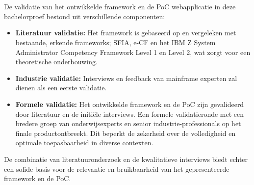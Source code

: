 \section{}%
\label{sec:validatie-poc}
De validatie van het ontwikkelde framework en de PoC webapplicatie in deze bachelorproef bestond uit verschillende componenten:
\begin{itemize}
	\item \textbf{Literatuur validatie:} Het framework is gebaseerd op en vergeleken met bestaande, erkende frameworks; SFIA, e-CF en het IBM Z System Administrator Competency Framework Level 1 en Level 2, wat zorgt voor een theoretische onderbouwing.
	\item \textbf{Industrie validatie:} Interviews en feedback van mainframe experten zal dienen als een eerste validatie.
	\item \textbf{Formele validatie:} Het ontwikkelde framework en de PoC zijn gevalideerd door literatuur en de initiële interviews. Een formele validatieronde met een bredere
	groep van onderwijsexperts en senior industrie-professionals op het finale
	productontbreekt. Dit beperkt de zekerheid over de volledigheid en optimale
	toepasbaarheid in diverse contexten.
\end{itemize}
De combinatie van literatuuronderzoek en de kwalitatieve interviews biedt echter een solide basis voor de relevantie en bruikbaarheid van het gepresenteerde framework en de PoC.